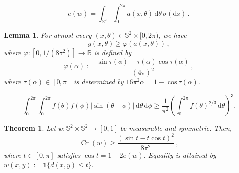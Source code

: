 \documentclass[10pt,a4paper]{amsart}
\newtheorem{theorem}{Theorem}
\newtheorem{lemma}{Lemma}
\newcommand{\II}[1]{\mathbf{1}{#1}}
\newcommand{\abs}[1]{\left\lvert#1\right\rvert}
\newcommand{\dd}{\mathrm{d}}
\begin{document}
\begin{equation}\label{eq:normalized-incidence-identity}
       e(w)= \int_{{\mathbb S}^2}\int_0^{2\pi}a(x,\theta)\,\dd\theta\,\sigma(\dd x)\,.
\end{equation}

\begin{lemma}\label{lem:normalized-bathtub-main}
For almost every \((x,\theta) \in {\mathbb S}^2 \times [0, 2\pi)\), we have 
\begin{equation}\label{eq:normalized-pointwise-bathtub}
    g(x,\theta) \geq \varphi (a (x,\theta))\,,
\end{equation}
where $\varphi : [0,1/(8\pi^2)] \to {\mathbb R}$ is defined by 
\begin{equation}\label{eq:normalized-bathtub-profile}
        \varphi(\alpha):=
        \frac{\sin \tau(\alpha)-\tau(\alpha)\cos \tau(\alpha)}{(4\pi)^2}\,,
\end{equation}
where $\tau(\alpha) \in [0,\pi]$ is determined by $16\pi^2 \alpha =1-\cos  \tau(\alpha).$
\end{lemma}

\begin{equation}\label{eq:busemann-circle-main}
        \int_0^{2\pi}\int_0^{2\pi}
        f(\theta)f(\phi)\abs{\sin(\theta-\phi)}
        \,\dd\theta\,\dd\phi
        \ge
        \frac1{\pi^2}
        \left(\int_0^{2\pi}f(\theta)^{2/3}\,\dd\theta\right)^3.
\end{equation}

\begin{theorem}\label{thm:continuous-spherical-crossing-main}
Let \(w:{\mathbb S}^2\times{\mathbb S}^2\to[0,1]\) be measurable and symmetric. Then,
\begin{equation}\label{eq:continuous-spherical-bound-main}
        \operatorname{Cr}(w)\ge
        \frac{(\sin t-t\cos t)^2}{8\pi^2}\,,
\end{equation}
where \(t\in[0,\pi]\) satisfies $\cos t = 1-2e(w)$. Equality is attained by \( w(x,y):=\II{\{d(x,y)\le t\}}.\) 
\end{theorem}
\end{document}
